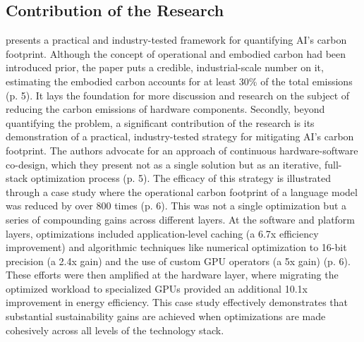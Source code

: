 \documentclass[a4paper, 12pt]{article}
\begin{document}
\subsection{Contribution of the Research}
\citet{Wu2022} presents a practical and industry-tested framework for quantifying AI's carbon footprint. Although the concept of operational and embodied carbon had been introduced prior, the paper puts a credible, industrial-scale number on it, estimating the embodied carbon accounts for at least 30\% of the total emissions (p. 5). It lays the foundation for more discussion and research on the subject of reducing the carbon emissions of hardware components. Secondly, beyond quantifying the problem, a significant contribution of the research is its demonstration of a practical, industry-tested strategy for mitigating AI's carbon footprint. The authors advocate for an approach of continuous hardware-software co-design, which they present not as a single solution but as an iterative, full-stack optimization process (p. 5). The efficacy of this strategy is illustrated through a case study where the operational carbon footprint of a language model was reduced by over 800 times (p. 6). This was not a single optimization but a series of compounding gains across different layers. At the software and platform layers, optimizations included application-level caching (a 6.7x efficiency improvement) and algorithmic techniques like numerical optimization to 16-bit precision (a 2.4x gain) and the use of custom GPU operators (a 5x gain) (p. 6). These efforts were then amplified at the hardware layer, where migrating the optimized workload to specialized GPUs provided an additional 10.1x improvement in energy efficiency. This case study effectively demonstrates that substantial sustainability gains are achieved when optimizations are made cohesively across all levels of the technology stack.\hfill \break
\end{document}
